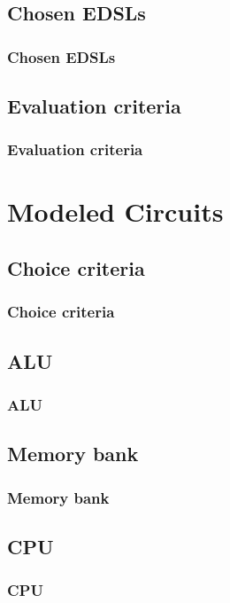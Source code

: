 \documentclass{beamer}
\begin{document}
        \subsection{Chosen EDSLs}
        \label{subsec:chosen-edsls}
            \begin{frame}
                \frametitle{Chosen EDSLs}
            \end{frame}

        \subsection{Evaluation criteria}
        \label{subsec:evaluation-criteria}
            \begin{frame}
                \frametitle{Evaluation criteria}
            \end{frame}


    \section{Modeled Circuits}
    \label{sec:modeled-circuits}
        \frame{\sectionpage}

        \subsection{Choice criteria}
        \label{subsec:circuit-choice-criteria}
            \begin{frame}
                \frametitle{Choice criteria}
            \end{frame}

        \subsection{ALU}
        \label{subsec:alu}
            \begin{frame}
                \frametitle{ALU}
            \end{frame}

        \subsection{Memory bank}
        \label{subsec:memory-bank}
            \begin{frame}
                \frametitle{Memory bank}
            \end{frame}

        \subsection{CPU}
        \label{subsec:cpu}
            \begin{frame}
                \frametitle{CPU}
            \end{frame}
\end{document}
